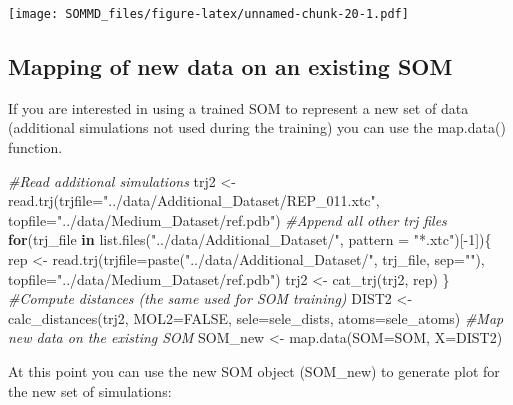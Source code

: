 \documentclass[
]{article}
\newenvironment{Shaded}{\begin{snugshade}}{\end{snugshade}}
\newcommand{\AttributeTok}[1]{\textcolor[rgb]{0.77,0.63,0.00}{#1}}
\newcommand{\CommentTok}[1]{\textcolor[rgb]{0.56,0.35,0.01}{\textit{#1}}}
\newcommand{\ConstantTok}[1]{\textcolor[rgb]{0.00,0.00,0.00}{#1}}
\newcommand{\ControlFlowTok}[1]{\textcolor[rgb]{0.13,0.29,0.53}{\textbf{#1}}}
\newcommand{\DecValTok}[1]{\textcolor[rgb]{0.00,0.00,0.81}{#1}}
\newcommand{\FunctionTok}[1]{\textcolor[rgb]{0.00,0.00,0.00}{#1}}
\newcommand{\NormalTok}[1]{#1}
\newcommand{\OtherTok}[1]{\textcolor[rgb]{0.56,0.35,0.01}{#1}}
\newcommand{\SpecialCharTok}[1]{\textcolor[rgb]{0.00,0.00,0.00}{#1}}
\newcommand{\StringTok}[1]{\textcolor[rgb]{0.31,0.60,0.02}{#1}}
\begin{document}
\texttt{[image: SOMMD\_files/figure-latex/unnamed-chunk-20-1.pdf]}

\hypertarget{mapping-of-new-data-on-an-existing-som}{%
\subsection{\texorpdfstring{\textbf{Mapping of new data on an existing
SOM}}{Mapping of new data on an existing SOM}}\label{mapping-of-new-data-on-an-existing-som}}

If you are interested in using a trained SOM to represent a new set of
data (additional simulations not used during the training) you can use
the map.data() function.

\begin{Shaded}
\begin{Highlighting}[]
\CommentTok{\#Read additional simulations}
\NormalTok{trj2 }\OtherTok{\textless{}{-}} \FunctionTok{read.trj}\NormalTok{(}\AttributeTok{trjfile=}\StringTok{"../data/Additional\_Dataset/REP\_011.xtc"}\NormalTok{, }\AttributeTok{topfile=}\StringTok{"../data/Medium\_Dataset/ref.pdb"}\NormalTok{)}
\CommentTok{\#Append all other trj files}
\ControlFlowTok{for}\NormalTok{(trj\_file }\ControlFlowTok{in} \FunctionTok{list.files}\NormalTok{(}\StringTok{"../data/Additional\_Dataset/"}\NormalTok{, }\AttributeTok{pattern =} \StringTok{"*.xtc"}\NormalTok{)[}\SpecialCharTok{{-}}\DecValTok{1}\NormalTok{])\{}
\NormalTok{  rep }\OtherTok{\textless{}{-}} \FunctionTok{read.trj}\NormalTok{(}\AttributeTok{trjfile=}\FunctionTok{paste}\NormalTok{(}\StringTok{"../data/Additional\_Dataset/"}\NormalTok{, trj\_file, }\AttributeTok{sep=}\StringTok{""}\NormalTok{), }
                  \AttributeTok{topfile=}\StringTok{"../data/Medium\_Dataset/ref.pdb"}\NormalTok{)}
\NormalTok{  trj2 }\OtherTok{\textless{}{-}} \FunctionTok{cat\_trj}\NormalTok{(trj2, rep)}
\NormalTok{\}}
\CommentTok{\#Compute distances (the same used for SOM training)}
\NormalTok{DIST2 }\OtherTok{\textless{}{-}} \FunctionTok{calc\_distances}\NormalTok{(trj2, }\AttributeTok{MOL2=}\ConstantTok{FALSE}\NormalTok{, }\AttributeTok{sele=}\NormalTok{sele\_dists, }\AttributeTok{atoms=}\NormalTok{sele\_atoms)}
\CommentTok{\#Map new data on the existing SOM}
\NormalTok{SOM\_new }\OtherTok{\textless{}{-}} \FunctionTok{map.data}\NormalTok{(}\AttributeTok{SOM=}\NormalTok{SOM, }\AttributeTok{X=}\NormalTok{DIST2)}
\end{Highlighting}
\end{Shaded}

At this point you can use the new SOM object (SOM\_new) to generate plot
for the new set of simulations:
\end{document}
